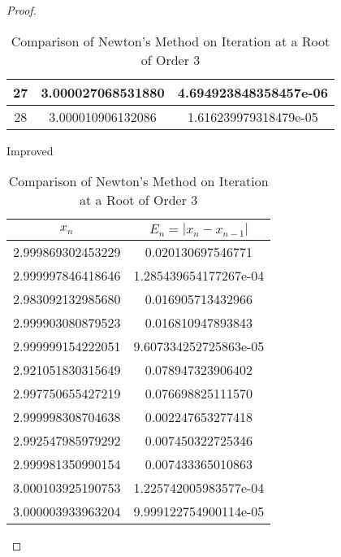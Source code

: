 \begin{enumerate}
\begin{proof}
\begin{table}[htbp]
\begin{subtable}[t]{.49\linewidth}
\begin{tabular}{|c|c|c|}
			\footnotesize	27	&	\footnotesize	3.000027068531880	&	\footnotesize	4.694923848358457e-06	\\	\hline
			\footnotesize	28	&	\footnotesize	3.000010906132086	&	\footnotesize	1.616239979318479e-05	\\	\hline
			\end{tabular}
		\end{subtable}
		\begin{subtable}[t]{.49\linewidth}
			\centering
			\caption{Improved}
			\begin{tabular}{|c|c|}
			\hline
			\(x_n\)				&	\(E_n=|x_n-x_{n-1}|\)	\\	\hline
			\footnotesize	2.999869302453229	&	\footnotesize	0.020130697546771	\\	\hline
			\footnotesize	2.999997846418646	&	\footnotesize	1.285439654177267e-04	\\	\hline
			\footnotesize	2.983092132985680	&	\footnotesize	0.016905713432966	\\	\hline
			\footnotesize	2.999903080879523	&	\footnotesize	0.016810947893843	\\	\hline
			\footnotesize	2.999999154222051	&	\footnotesize	9.607334252725863e-05	\\	\hline
			\footnotesize	2.921051830315649	&	\footnotesize	0.078947323906402	\\	\hline
			\footnotesize	2.997750655427219	&	\footnotesize	0.076698825111570	\\	\hline
			\footnotesize	2.999998308704638	&	\footnotesize	0.002247653277418	\\	\hline
			\footnotesize	2.992547985979292	&	\footnotesize	0.007450322725346	\\	\hline
			\footnotesize	2.999981350990154	&	\footnotesize	0.007433365010863	\\	\hline
			\footnotesize	3.000103925190753	&	\footnotesize	1.225742005983577e-04	\\	\hline
			\footnotesize	3.000003933963204	&	\footnotesize	9.999122754900114e-05	\\	\hline
			\end{tabular}
		\end{subtable}
		\caption{Comparison of Newton's Method on Iteration at a Root of Order 3}
		\label{newtoncompare3}
	\end{table}

	\end{proof}
\end{enumerate}


